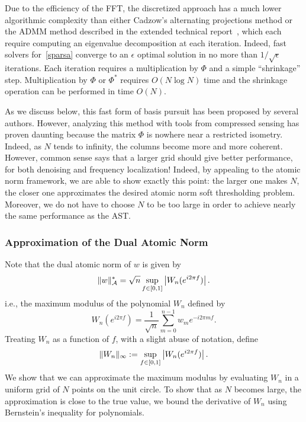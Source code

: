 Due to the efficiency of the FFT, the discretized approach has a much lower
algorithmic complexity than either Cadzow's alternating projections method or
the ADMM method described in the extended technical report~\cite{btr12}, which
each require computing an eigenvalue decomposition at each iteration. Indeed,
fast solvers for~\eqref{sparsa} converge to an $\epsilon$ optimal solution in no
more than $1/\sqrt{\epsilon}$ iterations. Each iteration requires a
multiplication by $\Phi$ and a simple ``shrinkage'' step. Multiplication by
$\Phi$ or $\Phi^*$ requires $O(N\log N)$ time and the shrinkage operation can be
performed in time $O(N)$.

As we discuss below, this fast form of basis pursuit has been proposed by
several authors. However, analyzing this method with tools from compressed
sensing has proven daunting because the matrix $\Phi$ is nowhere near a
restricted isometry. Indeed, as $N$ tends to infinity, the columns become more
and more coherent. However, common sense says that a larger grid should give
better performance, for both denoising and frequency localization! Indeed, by
appealing to the atomic norm framework, we are able to show exactly this point:
the larger one makes $N$, the closer one approximates the desired atomic norm
soft thresholding problem. Moreover, we do not have to choose $N$ to be too
large in order to achieve nearly the same performance as the AST.

\subsubsection{Approximation of the Dual Atomic Norm}
\label{proof:dual-norm-approximation}
Note that the dual atomic norm of $w$ is given by
\begin{equation}
  \label{eq:maximum-modulus}
  \lVert w\rVert_{\mathcal{A}}^* = \sqrt{n}\sup_{f \in [0,1]} \left| W_n(e^{i2\pi f}) \right|.
\end{equation}
i.e., the maximum modulus of the polynomial $W_n$ defined by
\begin{equation}
\label{eq:random-poly}
W_n(e^{i2\pi f}) =\frac{1}{\sqrt{n}} \sum_{m=0}^{n-1}{w_m e^{-i 2 \pi m f}}.
\end{equation}
Treating $W_n$ as a function of $f$,  with a slight abuse of  notation, define
\begin{equation*}
\lVert W_n\rVert_\infty := \sup_{f \in [0,1]} \left| W_n(e^{i2\pi f}) \right|.
\end{equation*}
We show that we can approximate the maximum modulus by evaluating $W_n$ in a
uniform grid of $N$ points on the unit circle. To show that as $N$ becomes large,
the approximation is close to the true value, we bound the derivative of $W_n$ 
using Bernstein's inequality for polynomials.

